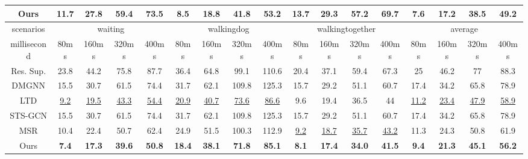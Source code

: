 \begin{table}[h]
{\begin{tabular}{c|cccc|cccc|cccc|cccc}
    Ours   & \textbf{11.7} & \textbf{27.8} & \textbf{59.4} & \textbf{73.5} & \textbf{8.5}  & \textbf{18.8} & \textbf{41.8} & \textbf{53.2} & \textbf{13.7} & \textbf{29.3} & \textbf{57.2} & \textbf{69.7} & \textbf{7.6} & \textbf{17.2} & \textbf{38.5} & \textbf{49.2} \\ \hline
    scenarios   & \multicolumn{4}{c}{waiting}                                   & \multicolumn{4}{c}{walkingdog}                                & \multicolumn{4}{c}{walkingtogether}                           & \multicolumn{4}{c}{average}                                      \\ \hline
    millisecond & 80ms          & 160ms         & 320ms         & 400ms         & 80ms          & 160ms         & 320ms         & 400ms         & 80ms          & 160ms         & 320ms         & 400ms         & 80ms         & 160ms         & 320ms         & 400ms         \\ \hline
    Res. Sup.   & 23.8          & 44.2          & 75.8          & 87.7          & 36.4          & 64.8          & 99.1          & 110.6         & 20.4          & 37.1          & 59.4          & 67.3          & 25           & 46.2          & 77            & 88.3          \\
    DMGNN & 15.5          & 30.7          & 61.5          & 74.4          & 31.7          & 62.1          & 109.8         & 125.3         & 15.7          & 29.2          & 51.1          & 60.7          & 17.4         & 34.2          & 65.8          & 78.9          \\
    LTD   & \underline{9.2}           & \underline{19.5}          & \underline{43.3}          & \underline{54.4}          & \underline{20.9}          & \underline{40.7}          &\underline{73.6}          & \underline{86.6}          & 9.6           & 19.4          & 36.5          & 44            & \underline{11.2}         & \underline{23.4}          & \underline{47.9}          & \underline{58.9}          \\
    STS-GCN & 15.5          & 30.7          & 61.5          & 74.4          & 31.7          & 62.1          & 109.8         & 125.3         & 15.7          & 29.2          & 51.1          & 60.7          & 17.4         & 34.2          & 65.8          & 78.9          \\
    MSR   & 10.4          & 22.4          & 50.7          & 62.4          & 24.9          & 51.5          & 100.3         & 112.9         & \underline{9.2}           & \underline{18.7}          & \underline{35.7}          & \underline{43.2}          & 11.3         & 24.3          & 50.8          & 61.9          \\
    Ours   & \textbf{7.4}  & \textbf{17.3} & \textbf{39.6} & \textbf{50.8} & \textbf{18.4} & \textbf{38.1} & \textbf{71.8} & \textbf{85.1} & \textbf{8.1}  & \textbf{17.4} & \textbf{34.0} & \textbf{41.5} & \textbf{9.4} & \textbf{21.3} & \textbf{45.1} & \textbf{56.2} \\ \hline
    \end{tabular}
    }
    \label{table:human3.6_shortterm_256}
    \end{table}


